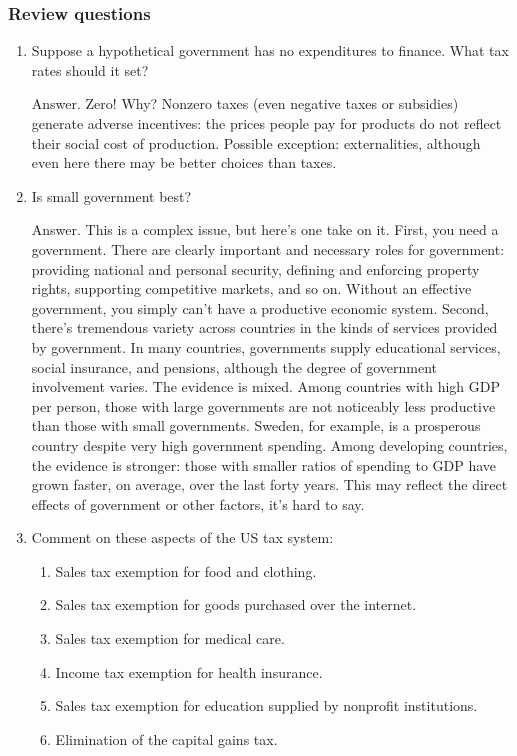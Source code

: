 \documentclass[letterpaper,12pt]{article}
\begin{document}
\subsubsection*{Review questions}

\begin{enumerate}

\item  Suppose a hypothetical government has no expenditures to finance.  What tax rates should it
set?

Answer.  Zero!  Why?  Nonzero taxes (even negative taxes or subsidies)
generate adverse incentives: the prices people pay for products
do not reflect their social cost of production.
Possible exception:
externalities, although even here there may be better choices than taxes.

\item  Is small government best?

Answer.  This is a complex issue, but here's one take on it.  First,
you need a government. There are clearly important and necessary
roles for government: providing national and personal security,
defining and enforcing property rights, supporting competitive
markets, and so on. Without an effective government, you simply
can't have a productive economic system. Second, there's tremendous
variety across countries in the kinds of services provided by
government.
In many countries, governments supply educational
services, social insurance, and pensions, although the degree of
government involvement varies. The evidence is mixed.  Among
countries with high GDP per person, those with large governments are
not noticeably less productive than those with small governments.
Sweden, for example, is a prosperous country despite very high
government spending. Among developing countries, the evidence is
stronger: those with smaller ratios of spending to GDP have grown faster,
on average, over the last forty years. This may reflect the direct
effects of government or other factors, it's hard to say.

\item Comment on these aspects of the US tax system:
\begin{enumerate}
\item Sales tax exemption for food and clothing.
\item Sales tax exemption for goods purchased over the internet.
\item Sales tax exemption for medical care.
\item Income tax exemption for health insurance.
\item Sales tax exemption for education supplied by nonprofit institutions.
\item Elimination of the capital gains tax.
\end{enumerate}


\end{enumerate}
\end{document}
